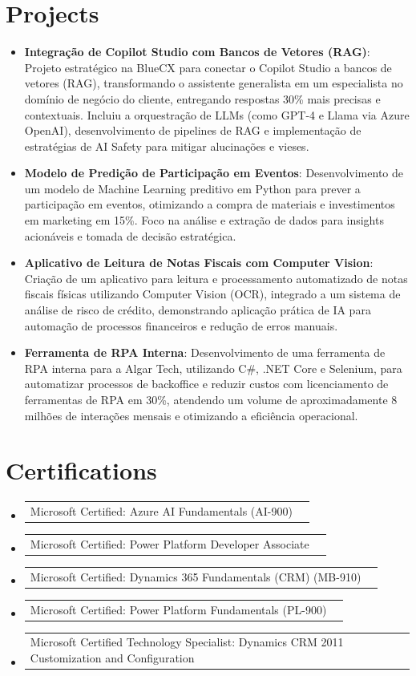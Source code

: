 \documentclass[a4paper,11pt]{article}
\makeatletter
\newcommand{\resumeItem}[1]{
  \item\small{
    {#1 \vspace{-2pt}}
  }
}
\newcommand{\resumeCertification}[2]{%
  \item
  \begin{tabular*}{0.97\textwidth}{@{}l@{\extracolsep{\fill}}r@{}}
    #1 & \text{#2} \\
  \end{tabular*}\vspace{-4pt}
}
\newcommand{\resumeSubItem}[2]{\resumeItem{#1: #2}\vspace{-4pt}}
\newcommand{\resumeSubHeadingListStart}{\begin{itemize}[leftmargin=0em, itemindent=0em, label={}, itemsep=0ex]}
\newcommand{\resumeSubHeadingListEnd}{\end{itemize}}
\makeatother
\begin{document}
\section{Projects}
\resumeSubHeadingListStart
\resumeSubItem{\textbf{Integração de Copilot Studio com Bancos de Vetores (RAG)}}{Projeto estratégico na BlueCX para conectar o Copilot Studio a bancos de vetores (RAG), transformando o assistente generalista em um especialista no domínio de negócio do cliente, entregando respostas 30\% mais precisas e contextuais. Incluiu a orquestração de LLMs (como GPT-4 e Llama via Azure OpenAI), desenvolvimento de pipelines de RAG e implementação de estratégias de AI Safety para mitigar alucinações e vieses.}
\resumeSubItem{\textbf{Modelo de Predição de Participação em Eventos}}{Desenvolvimento de um modelo de Machine Learning preditivo em Python para prever a participação em eventos, otimizando a compra de materiais e investimentos em marketing em 15\%. Foco na análise e extração de dados para insights acionáveis e tomada de decisão estratégica.}
\resumeSubItem{\textbf{Aplicativo de Leitura de Notas Fiscais com Computer Vision}}{Criação de um aplicativo para leitura e processamento automatizado de notas fiscais físicas utilizando Computer Vision (OCR), integrado a um sistema de análise de risco de crédito, demonstrando aplicação prática de IA para automação de processos financeiros e redução de erros manuais.}
\resumeSubItem{\textbf{Ferramenta de RPA Interna}}{Desenvolvimento de uma ferramenta de RPA interna para a Algar Tech, utilizando C\#, .NET Core e Selenium, para automatizar processos de backoffice e reduzir custos com licenciamento de ferramentas de RPA em 30\%, atendendo um volume de aproximadamente 8 milhões de interações mensais e otimizando a eficiência operacional.}
\resumeSubHeadingListEnd

\section{Certifications}
\resumeSubHeadingListStart
\resumeCertification{Microsoft Certified: Azure AI Fundamentals (AI-900)}{2025-12}{}{}
\resumeCertification{Microsoft Certified: Power Platform Developer Associate}{2025-12}{}{}
\resumeCertification{Microsoft Certified: Dynamics 365 Fundamentals (CRM) (MB-910)}{2023-12}{}{}
\resumeCertification{Microsoft Certified: Power Platform Fundamentals (PL-900)}{2023-12}{}{}
\resumeCertification{Microsoft Certified Technology Specialist: Dynamics CRM 2011 Customization and Configuration}{2013-12}{}{}
\resumeSubHeadingListEnd
\end{document}
